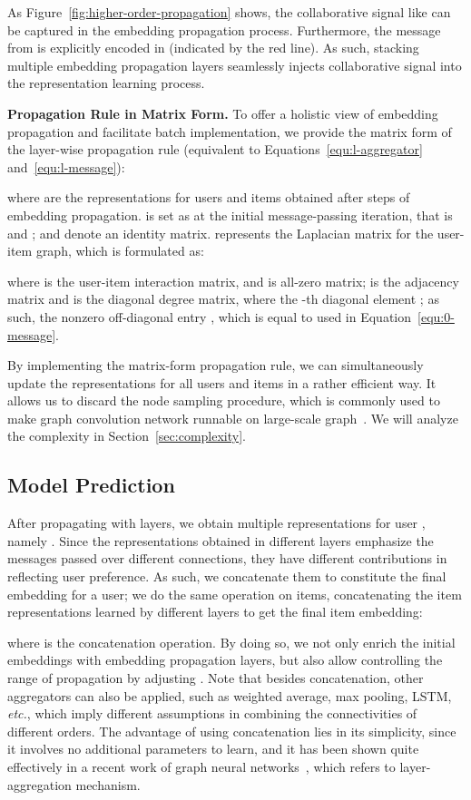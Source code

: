 \documentclass[sigconf]{acmart}
\newcommand{\etc}{\emph{etc.}}
\theoremstyle{definition}
\begin{document}
As Figure~\ref{fig:higher-order-propagation} shows, the collaborative signal like  can be captured in the embedding propagation process.
Furthermore, the message from  is explicitly encoded in  (indicated by the red line).
As such, stacking multiple embedding propagation layers seamlessly injects collaborative signal into the representation learning process.

\vspace{5px}
\noindent\textbf{Propagation Rule in Matrix Form.}
To offer a holistic view of embedding propagation and facilitate batch implementation, we provide the matrix form of the layer-wise propagation rule (equivalent to Equations~\eqref{equ:l-aggregator} and~\eqref{equ:l-message}):

where  are the representations for users and items obtained after  steps of embedding propagation.
 is set as  at the initial message-passing iteration, that is  and ;
and  denote an identity matrix.
 represents the Laplacian matrix for the user-item graph, which is formulated as:

where  is the user-item interaction matrix, and  is all-zero matrix;
 is the adjacency matrix
and  is the diagonal degree matrix, where the -th diagonal element ;
as such, the nonzero off-diagonal entry , which is equal to  used in Equation~\eqref{equ:0-message}.

By implementing the matrix-form propagation rule, we can simultaneously update the representations for all users and items in a rather efficient way. It allows us to discard the node sampling procedure, which is commonly used to make graph convolution network runnable on large-scale graph~\cite{DeepInf}.
We will analyze the complexity in Section~\ref{sec:complexity}.


\subsection{Model Prediction}

After propagating with  layers, we obtain multiple representations for user , namely .
Since the representations obtained in different layers emphasize the messages passed over different connections, they have different contributions in reflecting user preference.
As such, we concatenate them to constitute the final embedding for a user; we do the same operation on items, concatenating the item representations  learned by different layers to get the final item embedding:

where  is the concatenation operation.
By doing so, we not only enrich the initial embeddings with embedding propagation layers, but also allow controlling the range of propagation by adjusting . Note that besides concatenation, other aggregators can also be applied, such as weighted average, max pooling, LSTM, \etc, which imply different assumptions in combining the connectivities of different orders. The advantage of using concatenation lies in its simplicity, since it involves no additional parameters to learn, and it has been shown quite effectively in a recent work of graph neural networks~\cite{JumpKG}, which refers to layer-aggregation mechanism. 
\end{document}
